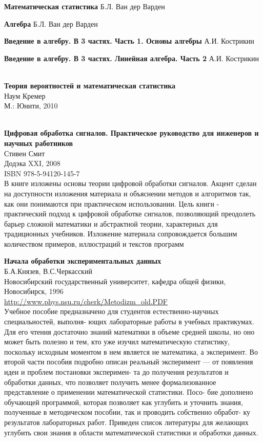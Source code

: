 \begin{thebibliography}{99}
\textbf{Математическая статистика}
Б.Л. Ван дер Варден

\textbf{Алгебра}
Б.Л. Ван дер Варден

\textbf{Введение в алгебру. В 3 частях. Часть 1. Основы алгебры}
А.И. Кострикин

\textbf{Введение в алгебру. В 3 частях. Линейная алгебра. Часть 2}
А.И. Кострикин

 \\
\textbf{Теория вероятностей и математическая статистика}\\
Наум Кремер\\
М.: Юнити, 2010

\ \\
\textbf{Цифровая обработка сигналов. Практическое руководство для инженеров и
научных работников}\\
Стивен Смит\\
Додэка XXI, 2008\\ISBN 978-5-94120-145-7\\
В книге изложены основы теории цифровой обработки сигналов. Акцент сделан на
доступности изложения материала и объяснении методов и алгоритмов так, как они
понимаются при практическом использовании. Цель книги - практический подход к
цифровой обработке сигналов, позволяющий преодолеть барьер сложной математики и
абстрактной теории, характерных для традиционных учебников. Изложение материала
сопровождается большим количеством примеров, иллюстраций и текстов программ

\textbf{Начала обработки экспериментальных данных}\\
Б.А.Князев, В.С.Черкасский\\
Новосибирский государственный университет, кафедра общей физики,
Новосибирск, 1996\\
\url{http://www.phys.nsu.ru/cherk/Metodizm_old.PDF}\\
Учебное пособие предназначено для студентов естественно-научных специальностей,
выполня- ющих лабораторные работы в учебных практикумах. Для его чтения
достаточно знаний математики в объеме средней школы, но оно может быть полезно и
тем, кто уже изучил математическую статистику, поскольку исходным моментом в нем
является не математика, а эксперимент. Во второй части пособия подробно описан
реальный эксперимент — от появления идеи и проблем постановки эксперимен- та до
получения результатов и обработки данных, что позволяет получить менее
формализованное представление о применении математической статистики. Посо- бие
дополнено обучающей программой, которая позволяет как углубить и уточнить
знания, полученные в методическом пособии, так и проводить собственно обработ-
ку результатов лабораторных работ. Приведен список литературы для желающих
углубить свои знания в области математической статистики и обработки данных.


\end{thebibliography}

